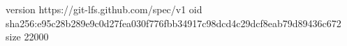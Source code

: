 version https://git-lfs.github.com/spec/v1
oid sha256:e95c28b289e9c0d27fea030f776fbb34917c98dcd4c29dcf8eab79d89436c672
size 22000
